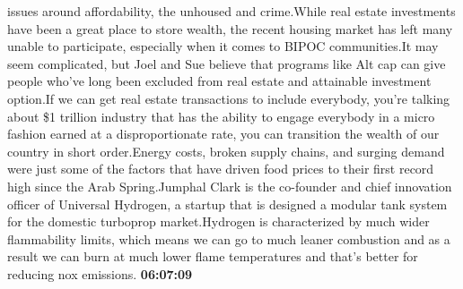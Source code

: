 \documentclass{article}%
\begin{document}
issues around affordability, the unhoused and crime.While real estate investments have been a great place to store wealth, the recent housing market has left many unable to participate, especially when it comes to BIPOC communities.It may seem complicated, but Joel and Sue believe that programs like Alt cap can give people who've long been excluded from real estate and attainable investment option.If we can get real estate transactions to include everybody, you're talking about \$1 trillion industry that has the ability to engage everybody in a micro fashion earned at a disproportionate rate, you can transition the wealth of our country in short order.Energy costs, broken supply chains, and surging demand were just some of the factors that have driven food prices to their first record high since the Arab Spring.Jumphal Clark is the co{-}founder and chief innovation officer of Universal Hydrogen, a startup that is designed a modular tank system for the domestic turboprop market.Hydrogen is characterized by much wider flammability limits, which means we can go to much leaner combustion and as a result we can burn at much lower flame temperatures and that's better for reducing nox emissions.%
\textbf{06:07:09}%
\end{document}
